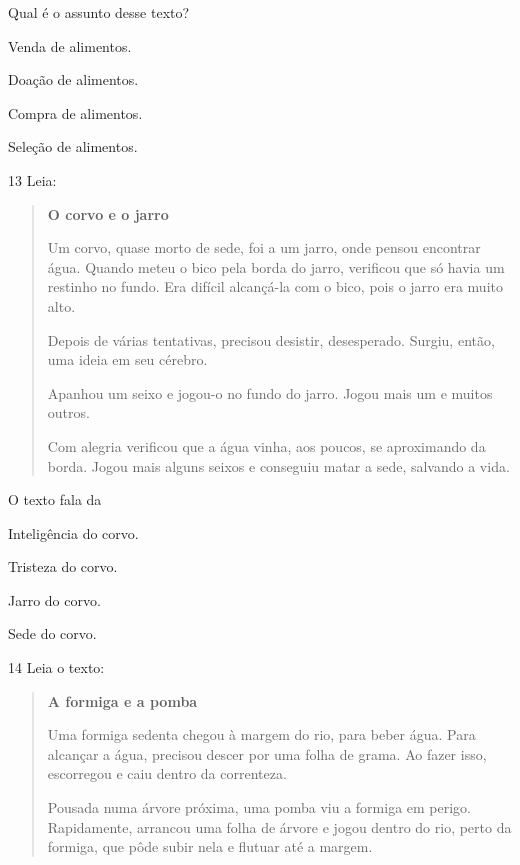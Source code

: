 Qual é o assunto desse texto?

\begin{escolha}
\item Venda de alimentos.

\item Doação de alimentos.

\item Compra de alimentos.

\item Seleção de alimentos.
\end{escolha}


\num{13} Leia:

\begin{quote}
\textbf{O corvo e o jarro}

Um corvo, quase morto de sede, foi a um jarro, onde pensou encontrar
água. Quando meteu o bico pela borda do jarro, verificou que só havia um
restinho no fundo. Era difícil alcançá-la com o bico, pois o jarro era
muito alto.

Depois de várias tentativas, precisou desistir, desesperado. Surgiu,
então, uma ideia em seu cérebro.

Apanhou um seixo e jogou-o no fundo do jarro. Jogou mais
um e muitos outros.

Com alegria verificou que a água vinha, aos poucos, se aproximando da
borda. Jogou mais alguns seixos e conseguiu matar a sede, salvando a
vida.
\end{quote}


O texto fala da

\begin{escolha}
\item Inteligência do corvo.

\item Tristeza do corvo.

\item Jarro do corvo.

\item Sede do corvo.
\end{escolha}

\num{14} Leia o texto:

\begin{quote}
\textbf{A formiga e a pomba}

Uma formiga sedenta chegou à margem do rio, para beber água. Para alcançar a água, precisou descer por uma folha de grama. Ao fazer isso, escorregou e caiu dentro da correnteza.

Pousada numa árvore próxima, uma pomba viu a formiga em perigo. Rapidamente, arrancou uma folha de árvore e jogou dentro do rio, perto da formiga, que pôde subir nela e flutuar até a margem.
\end{quote}

